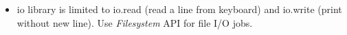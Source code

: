 \begin{itemize}
\item io library is limited to io.read (read a line from keyboard) and io.write (print without new line). Use \emph{Filesystem} API for file I/O jobs.
\end{itemize}